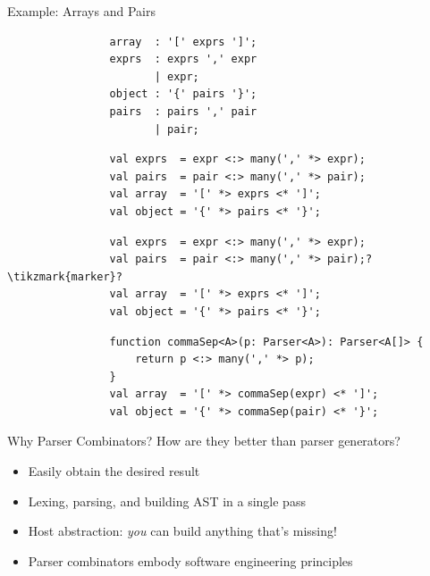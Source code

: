 \documentclass[aspectratio=169]{beamer}
\begin{document}
    \begin{frame}[fragile]{Example: Arrays and Pairs}
        \begin{overprint}
            \begin{verbatim}
                array  : '[' exprs ']';
                exprs  : exprs ',' expr
                       | expr;
                object : '{' pairs '}';
                pairs  : pairs ',' pair
                       | pair;
            \end{verbatim}
            \begin{verbatim}
                val exprs  = expr <:> many(',' *> expr);
                val pairs  = pair <:> many(',' *> pair);
                val array  = '[' *> exprs <* ']';
                val object = '{' *> pairs <* '}';
            \end{verbatim}
            \begin{verbatim}
                val exprs  = expr <:> many(',' *> expr);
                val pairs  = pair <:> many(',' *> pair);?\tikzmark{marker}?
                val array  = '[' *> exprs <* ']';
                val object = '{' *> pairs <* '}';
            \end{verbatim}
            \begin{verbatim}
                function commaSep<A>(p: Parser<A>): Parser<A[]> {
                    return p <:> many(',' *> p);
                }
                val array  = '[' *> commaSep(expr) <* ']';
                val object = '{' *> commaSep(pair) <* '}';
            \end{verbatim}
        \end{overprint}
    \end{frame}
    \begin{frame}{Why Parser Combinators?}
            How are they better than parser generators?
        \begin{itemize}
            \itemsep0.75em
            \item<2-> Easily obtain the desired result
            \item<3-> Lexing, parsing, and building AST in a single pass
            \item<4-> Host abstraction: \emph{you} can build anything that's missing!
            \item<5-> Parser combinators embody software engineering principles
        \end{itemize}
    \end{frame}
\end{document}
